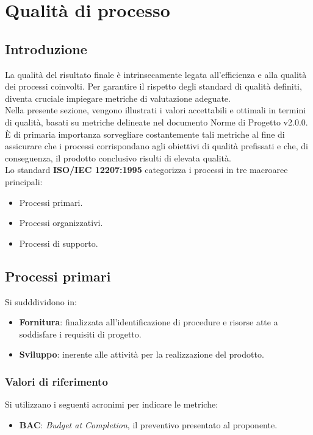 \section{Qualità di processo}
\subsection{Introduzione}
La qualità del risultato finale è intrinsecamente legata all'efficienza e alla qualità dei processi coinvolti.
Per garantire il rispetto degli standard di qualità definiti, diventa cruciale impiegare metriche di valutazione adeguate.\\
Nella presente sezione, vengono illustrati i valori accettabili e ottimali in termini di qualità, basati su metriche delineate nel documento Norme di Progetto v2.0.0. \\
È di primaria importanza sorvegliare costantemente tali metriche al fine di assicurare che i processi corrispondano agli obiettivi di qualità prefissati e che, di conseguenza, il prodotto conclusivo risulti di elevata qualità.\\

\noindent
Lo standard \textbf{ISO/IEC 12207:1995} categorizza i processi in tre macroaree principali:
\begin{itemize}
	\item Processi primari.
	\item Processi organizzativi.
	\item Processi di supporto.
\end{itemize}


\subsection{Processi primari}
Si sudddividono in:
\begin{itemize}
	\item \textbf{Fornitura}: finalizzata all'identificazione di procedure e risorse atte a soddisfare i requisiti di progetto.
	\item \textbf{Sviluppo}: inerente alle attività per la realizzazione del prodotto.
\end{itemize}

\subsubsection{Valori di riferimento}
Si utilizzano i seguenti acronimi per indicare le metriche:
\begin{itemize}
	\item \textbf{BAC}: \textit{Budget at Completion}, il preventivo presentato al proponente.
\end{itemize}

